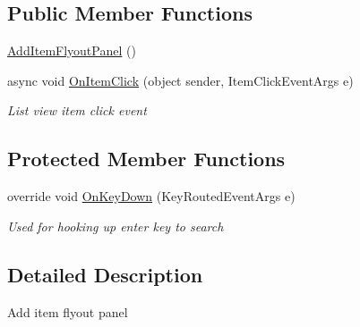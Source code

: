 \subsection*{Public Member Functions}
\begin{DoxyCompactItemize}
\item 
\hyperlink{class_field_service_1_1_win_r_t_1_1_views_1_1_add_item_flyout_panel_ab8baff333d0860320a685f80f8d2412e}{Add\+Item\+Flyout\+Panel} ()
\item 
async void \hyperlink{class_field_service_1_1_win_r_t_1_1_views_1_1_add_item_flyout_panel_a83da209549b87233ec9cbd0fa9a72bbd}{On\+Item\+Click} (object sender, Item\+Click\+Event\+Args e)
\begin{DoxyCompactList}\small\item\em List view item click event \end{DoxyCompactList}\end{DoxyCompactItemize}
\subsection*{Protected Member Functions}
\begin{DoxyCompactItemize}
\item 
override void \hyperlink{class_field_service_1_1_win_r_t_1_1_views_1_1_add_item_flyout_panel_a95c1db41274c354e3637ceba0d41463b}{On\+Key\+Down} (Key\+Routed\+Event\+Args e)
\begin{DoxyCompactList}\small\item\em Used for hooking up enter key to search \end{DoxyCompactList}\end{DoxyCompactItemize}


\subsection{Detailed Description}
Add item flyout panel 



